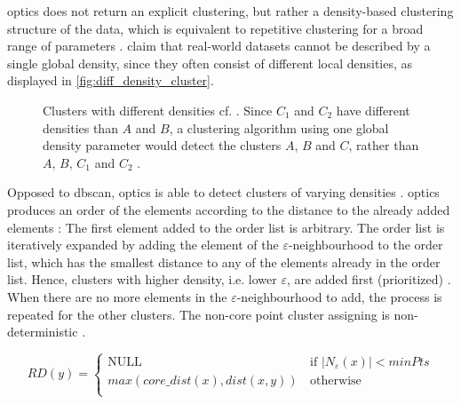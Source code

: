 \ac{optics} does not return an explicit clustering, but rather a density-based clustering structure of the data, 
which is equivalent to repetitive clustering for a broad range of parameters \cite{OPTICS1999}.
\citeauthor{OPTICS1999} claim that real-world datasets cannot be described by a single global density, since they often consist of different local densities, 
as displayed in \autoref{fig:diff_density_cluster}.

\begin{figure}[htp] %
    \centering
    
    \caption[Clusters with different densities]{Clusters with different densities cf. \cite{OPTICS1999}.
    Since $C_1$ and $C_2$ have different densities than $A$ and $B$, a clustering algorithm using one global density parameter would detect the clusters $A$, $B$ and $C$, 
    rather than $A$, $B$, $C_1$ and $C_2$ .
    }
    \label{fig:diff_density_cluster}
\end{figure}

Opposed to \ac{dbscan}, \ac{optics} is able to detect clusters of varying densities \cite{OPTICS2014}.
\ac{optics} produces an order of the elements according to the distance to the already added elements \cite{OPTICS2014, OPTICS2013}:
The first element added to the order list is arbitrary.
The order list is iteratively expanded by adding the element of the $\varepsilon$-neighbourhood to the order list, which has the smallest distance to any of the elements already in the order list.
Hence, clusters with higher density, i.e. lower $\varepsilon$, are added first (prioritized) \cite{OPTICS_kMeans_2016, OPTICS1999}.
When there are no more elements in the $\varepsilon$-neighbourhood to add, the process is repeated for the other clusters.
The non-core point cluster assigning is non-deterministic \cite{OPTICS2013}.

\begin{equation}
    RD(y) = \left\{
    \begin{array}{ll}
    \textrm{NULL} & \, \textrm{if |}N_\varepsilon (x)| < minPts \\
    max(core\_dist(x), dist(x,y)) & \, \textrm{otherwise} \\
    \end{array}
    \right. 
    \label{eq:optics-reachability-distance}
\end{equation}

